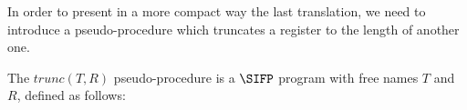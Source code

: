 In order to present in a more compact way the last translation, we need to introduce a pseudo-procedure which truncates a register to the length of another one.

\begin{defn}
The $trunc(T, R)$ pseudo-procedure is a $\SIFP$ program with free names $T$ and $R$, defined as follows:

\begin{comment}
\begin{align*}
trunc(T, R) \coloneqq &Q \takes R;\\
                      &R \takes \epsilon;\\
                      &Z \takes \epsilon;\\
                      &\while {Z \sqsubset T} {\\
                      &\quad B \takes \one;\\
                      &\quad \while {Z.\zero \sqsubseteq T \land B} {\\
                      &\quad \quad B \takes \one;\\
                      &\quad \quad \while {R.\zero \sqsubseteq Q \land B} {\\
                      &\quad \quad \quad R \takes R.\zero;\\
                      &\quad \quad \quad B \takes \zero;\\
                      &\quad \quad \quad }\\
                      &\quad \quad \while {R.\one \sqsubseteq Q \land B} {\\
                      &\quad \quad \quad R \takes R.\one;\\
                      &\quad \quad \quad B \takes \zero;\\
                      &\quad \quad \quad }\\
                      &\quad \quad Z \takes Z.0;\\
                      &\quad \quad B \takes 0;\\
                      &\quad \quad }\\
                      &\quad \while {Z.\one \sqsubseteq T \land B} {\\
                      &\quad \quad B \takes \one;\\
                      &\quad \quad \while {R.\zero \sqsubseteq Q \land B} {\\
                      &\quad \quad \quad R \takes R.\zero;\\

\end{comment}
\end{defn}
